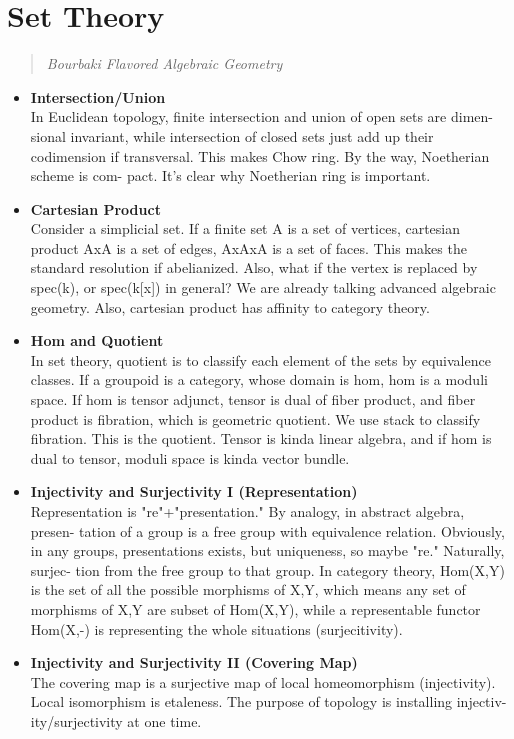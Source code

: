 \documentclass{article}
\begin{document}
\section {Set Theory}
\begin{quote}
\textit{Bourbaki Flavored Algebraic Geometry}
\end{quote}

\begin{itemize}
\item \textbf{Intersection/Union}\\
In Euclidean topology, finite intersection and union of open sets are dimen-
sional invariant, while intersection of closed sets just add up their codimension
if transversal. This makes Chow ring. By the way, Noetherian scheme is com-
pact. It’s clear why Noetherian ring is important.

\item \textbf{Cartesian Product}\\
Consider a simplicial set. If a finite set A is a set of vertices, cartesian product
AxA is a set of edges, AxAxA is a set of faces. This makes the standard
resolution if abelianized. Also, what if the vertex is replaced by spec(k), or
spec(k[x]) in general? We are already talking advanced algebraic geometry.
Also, cartesian product has affinity to category theory.

\item \textbf {Hom and Quotient} \\
In set theory, quotient is to classify each element of the sets by equivalence
classes. If a groupoid is a category, whose domain is hom, hom is a moduli space.
If hom is tensor adjunct, tensor is dual of fiber product, and fiber product is
fibration, which is geometric quotient. We use stack to classify fibration. This
is the quotient. Tensor is kinda linear algebra, and if hom is dual to tensor,
moduli space is kinda vector bundle.

\item \textbf{Injectivity and Surjectivity I (Representation)}\\
Representation is "re"+"presentation." By analogy, in abstract algebra, presen-
tation of a group is a free group with equivalence relation. Obviously, in any
groups, presentations exists, but uniqueness, so maybe "re." Naturally, surjec-
tion from the free group to that group. In category theory, Hom(X,Y) is the set
of all the possible morphisms of X,Y, which means any set of morphisms of X,Y
are subset of Hom(X,Y), while a representable functor Hom(X,-) is representing
the whole situations (surjecitivity).

\item \textbf{Injectivity and Surjectivity II (Covering Map)}\\
The covering map is a surjective map of local homeomorphism (injectivity).
Local isomorphism is etaleness. The purpose of topology is installing injectiv-
ity/surjectivity at one time.
\end{itemize}
\end{document}
